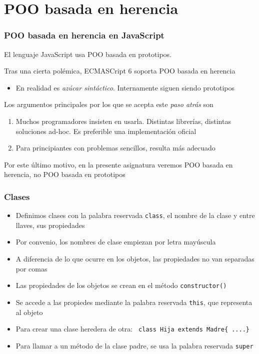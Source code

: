 \documentclass[ucs]{beamer}
\begin{document}
\section{POO basada en herencia}
\begin{frame}[fragile]
\frametitle{POO basada en herencia en JavaScript}
El lenguaje JavaScript usa POO basada en prototipos.

Tras una cierta polémica,
ECMASCript 6 soporta POO basada en herencia

    \begin{itemize}
    \item
En realidad es \emph{azúcar sintáctico}. Internamente siguen siendo prototipos
    \end{itemize}

Los argumentos principales por los que se acepta este \emph{paso atrás}
son

    \begin{enumerate}
    \item
Muchos programadores insisten en usarla. Distintas librerías, distintas
soluciones ad-hoc. Es preferible una implementación oficial

    \item
Para principiantes con problemas sencillos, resulta más adecuado
    \end{enumerate}

Por este último motivo, en la presente asignatura veremos POO basada en herencia, no
POO basada en prototipos
\end{frame}

\begin{frame}[fragile]
\frametitle{Clases}
\begin{itemize}
\item
Definimos clases con la palabra reservada
\verb|class|, el nombre de la clase y entre llaves, sus propiedades

\item
Por convenio, los nombres de clase empiezan por letra mayúscula

\item
A diferencia de lo que ocurre en los objetos, las propiedades no van separadas
por comas

\item
Las propiedades de los objetos se crean en el método
\verb|constructor()|

\item
Se accede a las propiedes mediante la palabra reservada
\verb|this|, que representa al objeto

\item
Para crear una clase heredera de otra:
\verb| class Hija extends Madre{ ....} |

\item
Para llamar a un método de la clase padre, se usa la palabra reservada
\verb|super|
\end{itemize}
\end{frame}
\end{document}
